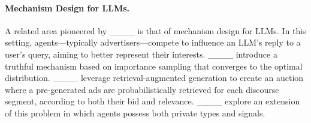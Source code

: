 \paragraph{Mechanism Design for LLMs.}
A related area pioneered by ____ is that of mechanism design for LLMs.
In this setting, agents---typically advertisers---compete to influence an LLM's reply to a user's query, aiming to better represent their interests.
____ introduce a truthful mechanism based on importance sampling that converges to the optimal distribution. 
____ leverage retrieval-augmented generation to create an auction where a pre-generated ads are probabilistically retrieved for each discourse segment, according to both their bid and relevance. 
____ explore an extension of this problem in which agents possess both private types and signals.